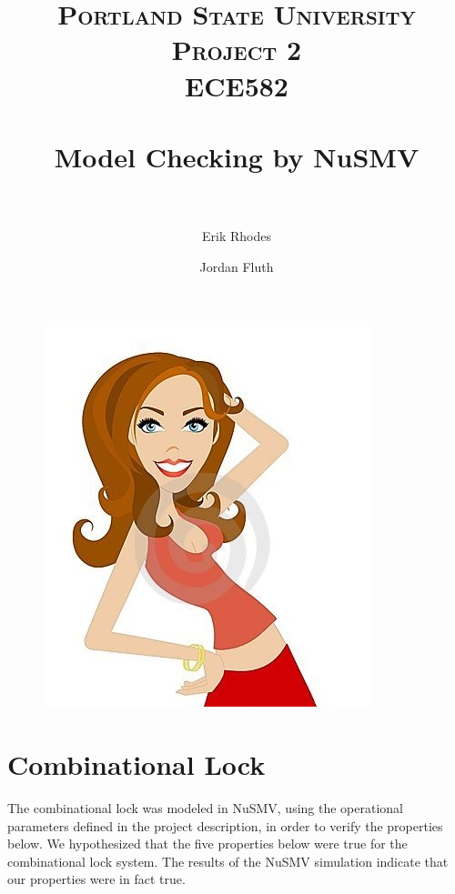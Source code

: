 \documentclass[11pt]{article}
\title{	
\normalfont \normalsize 
\textsc{\LARGE Portland State University}\\[1.5cm] %
\textsc{\Large Project 2}\\[0.5cm] %
\textsc{\large ECE582}\\[0.5cm] %
\horrule{1.2pt} \\[0.4cm] %
\huge Model Checking by NuSMV \\ %
\horrule{1.2pt} \\[0.5cm] %
}
\begin{document}
\raggedright
\author{Erik Rhodes \and Jordan Fluth} %
\maketitle %
\thispagestyle{empty}


\begin{figure}[h]\centering
\includegraphics[height=0.65\textwidth]{images/model.jpg}
		\label{LED}
	\end{figure}
	
\newpage




\section{Combinational Lock}
The combinational lock was modeled in NuSMV, using the operational parameters defined in the project description, in order to verify the properties below. We hypothesized that the five 
properties below were true for the combinational lock system. The results of the NuSMV simulation indicate that our properties were in fact true. 
	
\end{document}
